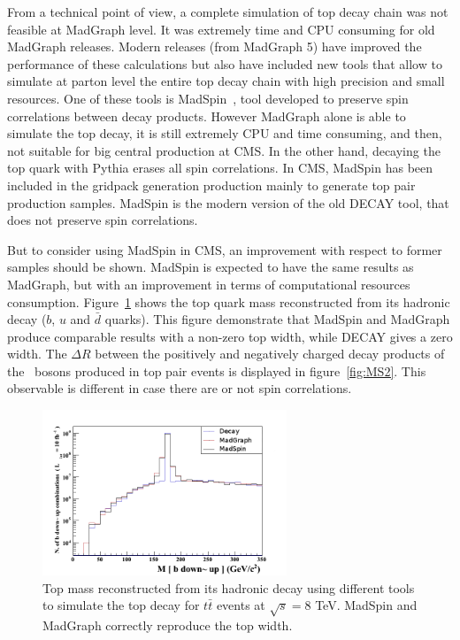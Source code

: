 From a technical point of view, a complete simulation of top decay chain was not feasible at MadGraph level. It was extremely time and CPU consuming for old MadGraph releases. Modern releases (from MadGraph 5) have improved the performance of these calculations but also have included new tools that allow to simulate at parton level the entire top decay chain with high precision and small resources. One of these tools is MadSpin~\cite{Artoisenet:2012st, Frixione:2007zp}, tool developed to preserve spin correlations between decay products. However MadGraph alone is able to simulate the top decay, it is still extremely CPU and time consuming, and then, not suitable for big central production at CMS. In the other hand, decaying the top quark with Pythia erases all spin correlations. In CMS, MadSpin has been included in the gridpack generation production mainly to generate top pair production samples. MadSpin is the modern version of the old DECAY tool, that does not preserve spin correlations.

But to consider using MadSpin in CMS, an improvement with respect to former samples should be shown. MadSpin is expected to have the same results as MadGraph, but with an improvement in terms of computational resources consumption. Figure~\ref{fig:MS1} shows the top quark mass reconstructed from its hadronic decay ($b$, $u$ and $\bar{d}$ quarks). This figure demonstrate that MadSpin and MadGraph produce comparable results with a non-zero top width, while DECAY gives a zero width. The $\Delta R$ between the positively and negatively charged decay products of the \W~bosons produced in top pair events is displayed in figure~\ref{fig:MS2}. This observable is different in case there are or not spin correlations. 

\begin{figure}[!Hhtbp]
  \begin{center}
    \includegraphics[width=0.65\textwidth]{figs/TT_MadSPin_1.png}
    \caption{Top mass reconstructed from its hadronic decay using different tools to simulate the top decay for $t\bar{t}$ events at $\sqrt{s}=8$ TeV. MadSpin and MadGraph correctly reproduce the top width.}
    \label{fig:MS1}
  \end{center}
\end{figure}

